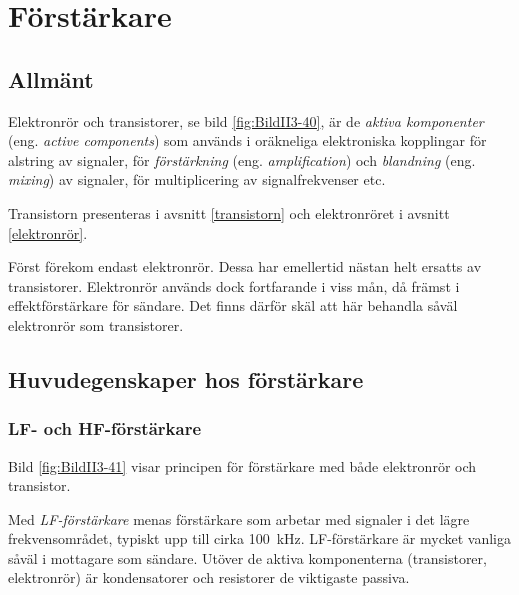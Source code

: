 \section{Förstärkare}

\subsection{Allmänt}


Elektronrör och transistorer, se bild \ref{fig:BildII3-40}, är de
\emph{aktiva komponenter} (eng. \emph{active components}) som används i
oräkneliga elektroniska kopplingar för alstring av signaler, för
\emph{förstärkning} (eng. \emph{amplification}) och \emph{blandning} (eng.
\emph{mixing}) av signaler, för multiplicering av signalfrekvenser etc.

Transistorn presenteras i avsnitt \ref{transistorn} och elektronröret i avsnitt \ref{elektronrör}.

Först förekom endast elektronrör.
Dessa har emellertid nästan helt ersatts av transistorer.
Elektronrör används dock fortfarande i viss mån, då främst i effektförstärkare
för sändare.
Det finns därför skäl att här behandla såväl elektronrör som transistorer.

\subsection{Huvudegenskaper hos förstärkare}
\subsubsection{LF- och HF-förstärkare}


Bild \ref{fig:BildII3-41} visar principen för förstärkare med både elektronrör
och transistor.

Med \emph{LF-förstärkare} menas förstärkare som arbetar med signaler i
det lägre frekvensområdet, typiskt upp till cirka 100~kHz.
LF-förstärkare är mycket vanliga såväl i mottagare som sändare.
Utöver de aktiva komponenterna (transistorer, elektronrör) är kondensatorer
och resistorer de viktigaste passiva.

